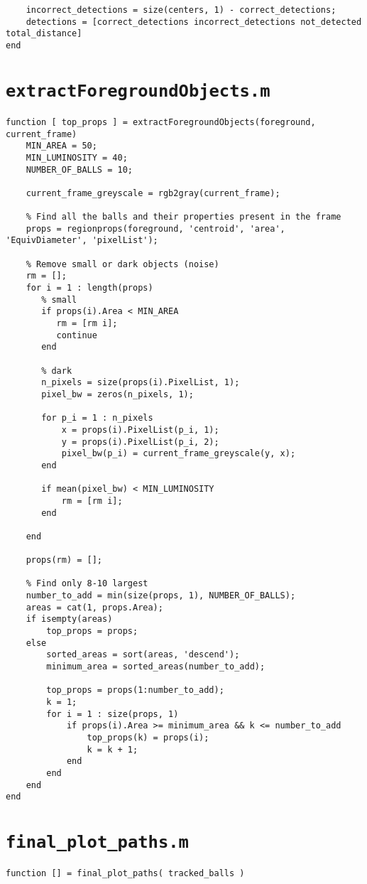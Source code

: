 \documentclass[12pt,a4paper]{article}
\begin{document}
\begin{appendices}
\begin{verbatim}
    incorrect_detections = size(centers, 1) - correct_detections;
    detections = [correct_detections incorrect_detections not_detected total_distance]
end
\end{verbatim}

\chapter{\texttt{extractForegroundObjects.m}}
\begin{verbatim}
function [ top_props ] = extractForegroundObjects(foreground, current_frame)
    MIN_AREA = 50;
    MIN_LUMINOSITY = 40;
    NUMBER_OF_BALLS = 10;
    
    current_frame_greyscale = rgb2gray(current_frame);
    
    % Find all the balls and their properties present in the frame
    props = regionprops(foreground, 'centroid', 'area', 'EquivDiameter', 'pixelList');
    
    % Remove small or dark objects (noise)
    rm = [];
    for i = 1 : length(props)
       % small
       if props(i).Area < MIN_AREA
          rm = [rm i];
          continue
       end
       
       % dark
       n_pixels = size(props(i).PixelList, 1);
       pixel_bw = zeros(n_pixels, 1);
       
       for p_i = 1 : n_pixels
           x = props(i).PixelList(p_i, 1);
           y = props(i).PixelList(p_i, 2);
           pixel_bw(p_i) = current_frame_greyscale(y, x);
       end
       
       if mean(pixel_bw) < MIN_LUMINOSITY
           rm = [rm i];
       end
       
    end
    
    props(rm) = [];
    
    % Find only 8-10 largest
    number_to_add = min(size(props, 1), NUMBER_OF_BALLS); 
    areas = cat(1, props.Area);
    if isempty(areas)
        top_props = props;
    else
        sorted_areas = sort(areas, 'descend');
        minimum_area = sorted_areas(number_to_add);
    
        top_props = props(1:number_to_add);
        k = 1;
        for i = 1 : size(props, 1)
            if props(i).Area >= minimum_area && k <= number_to_add
                top_props(k) = props(i);
                k = k + 1;
            end
        end
    end
end
\end{verbatim}

\chapter{\texttt{final\_plot\_paths.m}}
\begin{verbatim}
function [] = final_plot_paths( tracked_balls )


\end{verbatim}
\end{appendices}
\end{document}
